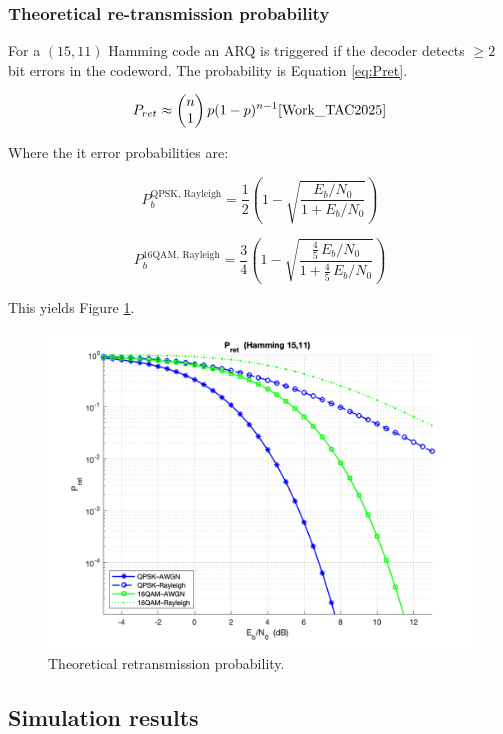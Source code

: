 \subsubsection{Theoretical re-transmission probability}

For a $(15,11)$ Hamming code an ARQ is triggered if the decoder
detects \(\ge 2\) bit errors in the codeword. The probability is Equation \ref{eq:Pret}.

\begin{equation}
      P_{ret} \approx \begin{pmatrix}n \\ 1\end{pmatrix}p(1-p)^{n-1} \text{\cite{Work_TAC2025}}
      \label{eq:Pret}
\end{equation}

Where the it error probabilities are: 

\begin{equation}
      P_b^{\text{QPSK, Rayleigh}} = \frac{1}{2} \left( 1 - \sqrt{ \frac{E_b / N_0}{1 + E_b / N_0} } \right )
\end{equation}

\begin{equation}
      P_b^{\text{16QAM, Rayleigh}} = \frac{3}{4} \left( 1 - \sqrt{ \frac{ \frac{4}{5} \, E_b / N_0 }{ 1 + \frac{4}{5} \, E_b / N_0 } } \right )
\end{equation}


This yields Figure \ref{fig:Pret_Teo}.

\begin{figure}[H]
  \centering
  \includegraphics[width=0.7\linewidth]{Images/Pret_hamm.png}
  \caption{Theoretical retransmission probability.}
  \label{fig:Pret_Teo}
\end{figure}

\subsection{Simulation results}

